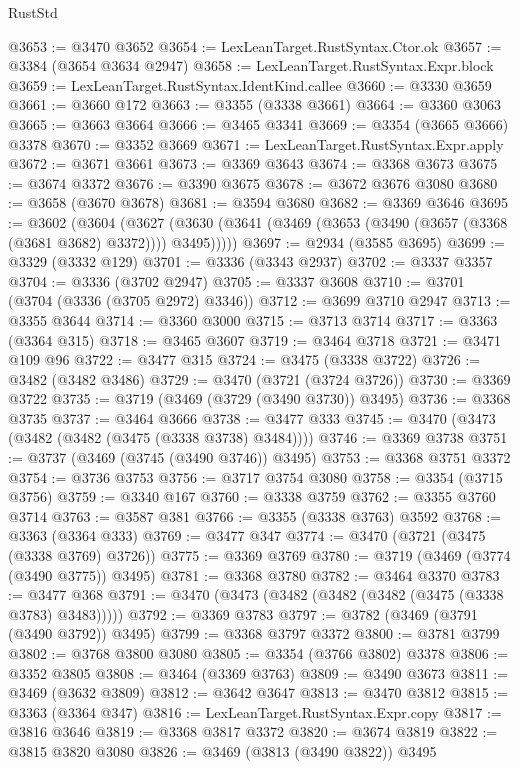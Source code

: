 \begin{lexlean}{RustStd}
\begin{coremodule}
@3653 := @3470 @3652
@3654 := LexLeanTarget.RustSyntax.Ctor.ok
@3657 := @3384 (@3654 @3634 @2947)
@3658 := LexLeanTarget.RustSyntax.Expr.block
@3659 := LexLeanTarget.RustSyntax.IdentKind.callee
@3660 := @3330 @3659
@3661 := @3660 @172
@3663 := @3355 (@3338 @3661)
@3664 := @3360 @3063
@3665 := @3663 @3664
@3666 := @3465 @3341
@3669 := @3354 (@3665 @3666) @3378
@3670 := @3352 @3669
@3671 := LexLeanTarget.RustSyntax.Expr.apply
@3672 := @3671 @3661
@3673 := @3369 @3643
@3674 := @3368 @3673
@3675 := @3674 @3372
@3676 := @3390 @3675
@3678 := @3672 @3676 @3080
@3680 := @3658 (@3670 @3678)
@3681 := @3594 @3680
@3682 := @3369 @3646
@3695 := @3602
    (@3604
      (@3627 (@3630 (@3641 (@3469 (@3653 (@3490 (@3657 (@3368 (@3681 @3682) @3372)))) @3495)))))
@3697 := @2934 (@3585 @3695)
@3699 := @3329 (@3332 @129)
@3701 := @3336 (@3343 @2937)
@3702 := @3337 @3357
@3704 := @3336 (@3702 @2947)
@3705 := @3337 @3608
@3710 := @3701 (@3704 (@3336 (@3705 @2972) @3346))
@3712 := @3699 @3710 @2947
@3713 := @3355 @3644
@3714 := @3360 @3000
@3715 := @3713 @3714
@3717 := @3363 (@3364 @315)
@3718 := @3465 @3607
@3719 := @3464 @3718
@3721 := @3471 @109 @96
@3722 := @3477 @315
@3724 := @3475 (@3338 @3722)
@3726 := @3482 (@3482 @3486)
@3729 := @3470 (@3721 (@3724 @3726))
@3730 := @3369 @3722
@3735 := @3719 (@3469 (@3729 (@3490 @3730)) @3495)
@3736 := @3368 @3735
@3737 := @3464 @3666
@3738 := @3477 @333
@3745 := @3470 (@3473 (@3482 (@3482 (@3475 (@3338 @3738) @3484))))
@3746 := @3369 @3738
@3751 := @3737 (@3469 (@3745 (@3490 @3746)) @3495)
@3753 := @3368 @3751 @3372
@3754 := @3736 @3753
@3756 := @3717 @3754 @3080
@3758 := @3354 (@3715 @3756)
@3759 := @3340 @167
@3760 := @3338 @3759
@3762 := @3355 @3760 @3714
@3763 := @3587 @381
@3766 := @3355 (@3338 @3763) @3592
@3768 := @3363 (@3364 @333)
@3769 := @3477 @347
@3774 := @3470 (@3721 (@3475 (@3338 @3769) @3726))
@3775 := @3369 @3769
@3780 := @3719 (@3469 (@3774 (@3490 @3775)) @3495)
@3781 := @3368 @3780
@3782 := @3464 @3370
@3783 := @3477 @368
@3791 := @3470 (@3473 (@3482 (@3482 (@3482 (@3475 (@3338 @3783) @3483)))))
@3792 := @3369 @3783
@3797 := @3782 (@3469 (@3791 (@3490 @3792)) @3495)
@3799 := @3368 @3797 @3372
@3800 := @3781 @3799
@3802 := @3768 @3800 @3080
@3805 := @3354 (@3766 @3802) @3378
@3806 := @3352 @3805
@3808 := @3464 (@3369 @3763)
@3809 := @3490 @3673
@3811 := @3469 (@3632 @3809)
@3812 := @3642 @3647
@3813 := @3470 @3812
@3815 := @3363 (@3364 @347)
@3816 := LexLeanTarget.RustSyntax.Expr.copy
@3817 := @3816 @3646
@3819 := @3368 @3817 @3372
@3820 := @3674 @3819
@3822 := @3815 @3820 @3080
@3826 := @3469 (@3813 (@3490 @3822)) @3495

\end{coremodule}
\end{lexlean}
